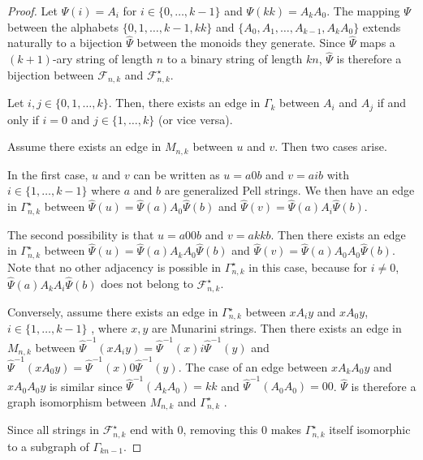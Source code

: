 \documentclass[10pt,a4paper]{amsart}
\newcommand{\Fib}{{\mathcal F}}
\begin{document}
\begin{proof}
Let $\Psi(i)=A_i$ for $i\in\{0,\ldots,k-1\}$ and $\Psi(kk)=A_kA_0$. The mapping $\Psi$ between the alphabets $\{0,1,\ldots,k-1,kk\}$ and $\{A_0,A_1,\ldots,A_{k-1},A_kA_0\}$  extends naturally to a bijection $\widehat{\Psi}$ between the monoids they generate. Since $\widehat{\Psi}$ maps a $(k+1)$-ary string of length $n$ to a binary string of length $kn$, $\widehat{\Psi}$ is therefore a bijection between $\Fib_{n,k}$ and $\Fib_{n,k}^\star$. 

Let $i,j\in\{0,1,\ldots,k\}$. Then, there exists an edge in $\Gamma_k$ between $A_i$ and $A_j$ if and only if $i=0$ and $j\in\{1,\ldots,k\}$ (or vice versa). 

Assume there exists an edge in $M_{n,k}$ between $u$ and $v$. Then two cases arise.

In the first case,  $u$ and $v$ can be written as  $u=a0b$ and $v=aib$ with $i\in\{1,\ldots,k-1\}$ where $a$ and $b$ are generalized Pell strings. We then have an edge in $\Gamma_{n,k}^\star$ between 
$\widehat{\Psi}(u)=\widehat{\Psi}(a)A_0\widehat{\Psi}(b)$ and $\widehat{\Psi}(v)=\widehat{\Psi}(a)A_i\widehat{\Psi}(b)$.

The second possibility is that $u=a00b$ and $v=akkb$. Then there exists an edge in $\Gamma_{n,k}^\star$ between 
$\widehat{\Psi}(u)=\widehat{\Psi}(a)A_kA_0\widehat{\Psi}(b)$ and $\widehat{\Psi}(v)=\widehat{\Psi}(a)A_0A_0\widehat{\Psi}(b)$. Note that no other adjacency is possible in $\Gamma_{n,k}^\star$ in this case, because for $i\neq0$, $\widehat{\Psi}(a)A_kA_i\widehat{\Psi}(b)$ does not belong to $\Fib_{n,k}^\star$. 
  
Conversely, assume there exists an edge in $\Gamma_{n,k}^\star$	between $xA_iy$ and $xA_0y$, $i\in\{1,\ldots,k-1\}$ , where $x,y$ are  Munarini strings. Then there exists an edge in $M_{n,k}$ between $\widehat{\Psi}^{-1}(xA_iy)=\widehat{\Psi}^{-1}(x)i\widehat{\Psi}^{-1}(y)$ and $\widehat{\Psi}^{-1}(xA_0y)=\widehat{\Psi}^{-1}(x)0\widehat{\Psi}^{-1}(y)$. The case of an edge between $xA_kA_0y$ and $xA_0A_0y$ is similar since $\widehat{\Psi}^{-1}(A_kA_0)=kk$ and $\widehat{\Psi}^{-1}(A_0A_0)=00$.
$\widehat{\Psi}$ is therefore a graph isomorphism between $M_{n,k}$ and $\Gamma_{n,k}^\star$ .

Since all strings in $\Fib_{n,k}^\star$ end with 0, removing this 0 makes $\Gamma_{n,k}^\star$ itself isomorphic to a subgraph of $\Gamma_{kn-1}$.
\end{proof}
\end{document}

